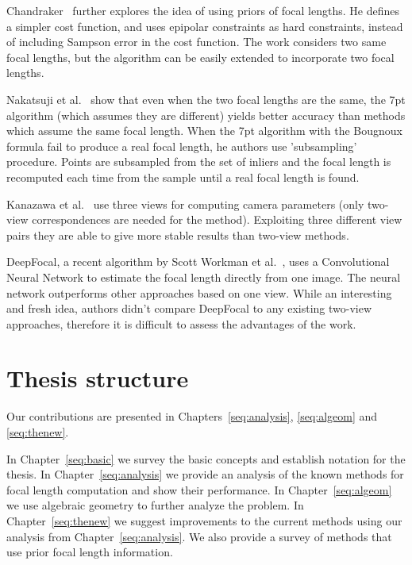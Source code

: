Chandraker~\cite{Chandraker} further explores the idea of using priors of focal lengths. He defines a simpler cost function, and uses epipolar constraints as hard constraints, instead of including Sampson error in the cost function. The work considers two same focal lengths, but the algorithm can be easily extended to incorporate two focal lengths. 

Nakatsuji et al.~\cite{Kanatani3} show that even when the two focal lengths are the same, the 7pt algorithm (which assumes they are different) yields better accuracy than methods which assume the same focal length.
When the 7pt algorithm with the Bougnoux formula fail to produce a real focal length, he authors use 'subsampling' procedure. Points are subsampled from the set of inliers and the focal length is recomputed  each time from the sample until a real focal length is found.

Kanazawa et al.~\cite{KanataniSub} use three views for computing camera parameters (only two-view correspondences are needed for the method). Exploiting three different view pairs they are able to give more stable results than two-view methods.

DeepFocal, a recent algorithm by Scott Workman et al.~\cite{CNN}, uses a Convolutional Neural Network to estimate the focal length directly from one image. The neural network outperforms other approaches based on one view. While an interesting and fresh idea, authors didn't compare DeepFocal to any existing two-view approaches, therefore it is difficult to assess the advantages of the work.

\section{Thesis structure}


Our contributions are presented in Chapters~\ref{seq:analysis}, \ref{seq:algeom} and \ref{seq:thenew}.

In Chapter~\ref{seq:basic} we survey the basic concepts and establish notation for the thesis. In  Chapter~\ref{seq:analysis} we provide an analysis of the known methods for focal length computation and show their performance. In  Chapter~\ref{seq:algeom} we use algebraic geometry to further analyze the problem. In  Chapter~\ref{seq:thenew} we suggest improvements to the current methods using our analysis from  Chapter~\ref{seq:analysis}. We also provide a survey of methods that use prior focal length information.